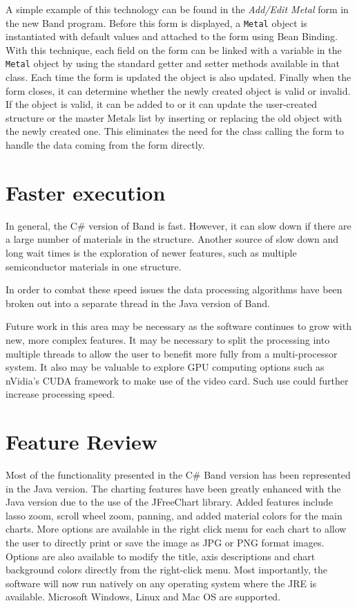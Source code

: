 \documentclass[project]{bsu-ms}
\begin{document}
A simple example of this technology can be found in the \emph{Add/Edit Metal} form in the new Band program. Before this form is displayed, a \texttt{Metal} object is instantiated with default values and attached to the form using Bean Binding. With this technique, each field on the form can be linked with a variable in the \texttt{Metal} object by using the standard getter and setter methods available in that class. Each time the form is updated the object is also updated. Finally when the form closes, it can determine whether the newly created object is valid or invalid. If the object is valid, it can be added to or it can update the user-created structure or the master Metals list by inserting or replacing the old object with the newly created one. This eliminates the need for the class calling the form to handle the data coming from the form directly.



\section{Faster execution}\label{sec:fasterExecution}
In general, the C\# version of Band is fast. However, it can slow down if there are a large number of materials in the structure. Another source of slow down and long wait times is the exploration of newer features, such as multiple semiconductor materials in one structure.

In order to combat these speed issues the data processing algorithms have been broken out into a separate thread in the Java version of Band.

Future work in this area may be necessary as the software continues to grow with new, more complex features. It may be necessary to split the processing into multiple threads to allow the user to benefit more fully from a multi-processor system. It also may be valuable to explore GPU computing options such as nVidia's CUDA framework to make use of the video card. Such use could further increase processing speed.



\section{Feature Review}\label{sec:featureReview}
Most of the functionality presented in the C\# Band version has been represented in the Java version. The charting features have been greatly enhanced with the Java version due to the use of the JFreeChart library. Added features include lasso zoom, scroll wheel zoom, panning, and added material colors for the main charts. More options are available in the right click menu for each chart to allow the user to directly print or save the image as JPG or PNG format images. Options are also available to modify the title, axis descriptions and chart background colors directly from the right-click menu. Most importantly, the software will now run natively on any operating system where the JRE is available. Microsoft Windows, Linux and Mac OS are supported.
\end{document}
